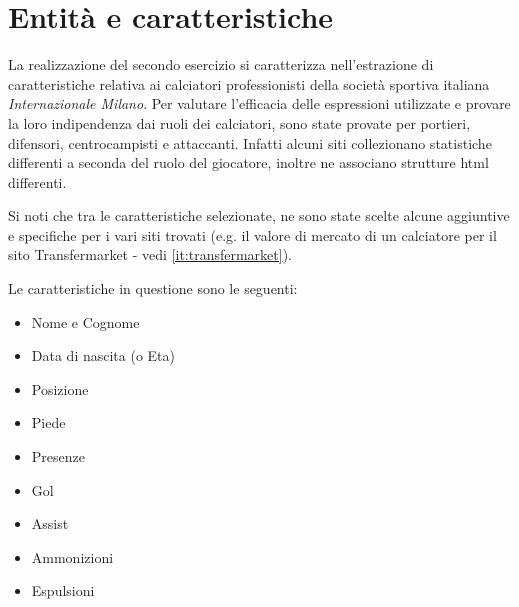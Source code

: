 \section{Entità e caratteristiche}
La realizzazione del secondo esercizio si caratterizza nell'estrazione di caratteristiche relativa ai calciatori professionisti della società sportiva italiana \textit{Internazionale Milano}. Per valutare l'efficacia delle espressioni utilizzate e provare la loro indipendenza dai ruoli dei calciatori, sono state provate per portieri, difensori, centrocampisti e attaccanti. Infatti alcuni siti collezionano statistiche differenti a seconda del ruolo del giocatore, inoltre ne associano strutture html differenti.

Si noti che tra le caratteristiche selezionate, ne sono state scelte alcune aggiuntive e specifiche per i vari siti trovati (e.g. il valore di mercato di un calciatore per il sito Transfermarket - vedi \ref{it:transfermarket}).

Le caratteristiche in questione sono le seguenti:
\begin{itemize}
\setlength\itemsep{0.1em}
    \item Nome e Cognome
    \item Data di nascita (o Eta)
    \item Posizione
    \item Piede
    \item Presenze
    \item Gol
    \item Assist
    \item Ammonizioni
    \item Espulsioni
\end{itemize}

